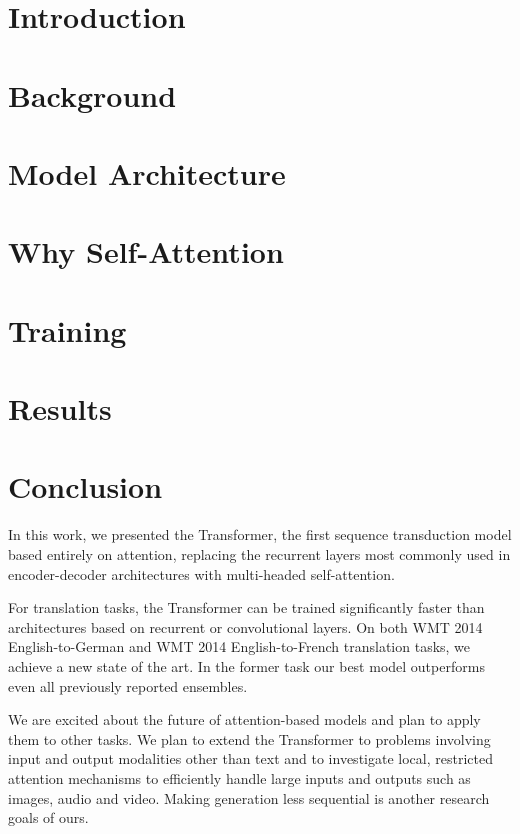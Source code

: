 \documentclass{article}
\begin{document}
\section{Introduction}



\section{Background}



\section{Model Architecture}

 
\section{Why Self-Attention}


\section{Training}

 
\section{Results} \label{sec:results}


\section{Conclusion}
In this work, we presented the Transformer, the first sequence transduction model based entirely on attention, replacing the recurrent layers most commonly used in encoder-decoder architectures with multi-headed self-attention.

For translation tasks, the Transformer can be trained significantly faster than architectures based on recurrent or convolutional layers. On both WMT 2014 English-to-German and WMT 2014 English-to-French translation tasks, we achieve a new state of the art. In the former task our best model outperforms even all previously reported ensembles. %

We are excited about the future of attention-based models and plan to apply them to other tasks. We plan to extend the Transformer to problems involving input and output modalities other than text and to investigate local, restricted attention mechanisms to efficiently handle large inputs and outputs such as images, audio and video.
Making generation less sequential is another research goals of ours.
\end{document}

